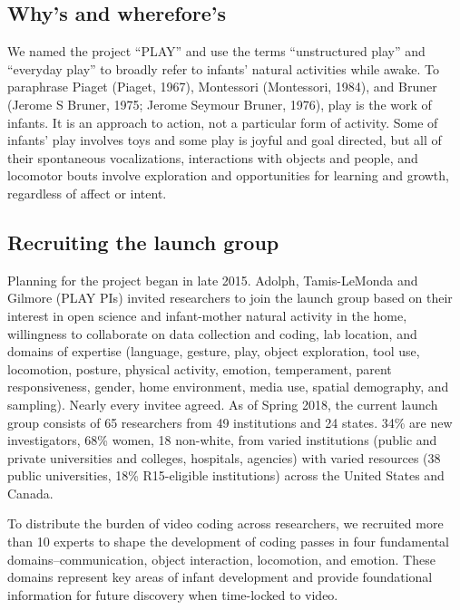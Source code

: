 \documentclass[english,man]{apa6}
\theoremstyle{definition}
\theoremstyle{definition}
\theoremstyle{definition}
\theoremstyle{remark}
\begin{document}
\subsection{Why's and wherefore's}\label{whys-and-wherefores}

We named the project \enquote{PLAY} and use the terms
\enquote{unstructured play} and \enquote{everyday play} to broadly refer
to infants' natural activities while awake. To paraphrase Piaget
(Piaget, 1967), Montessori (Montessori, 1984), and Bruner (Jerome S
Bruner, 1975; Jerome Seymour Bruner, 1976), play is the work of infants.
It is an approach to action, not a particular form of activity. Some of
infants' play involves toys and some play is joyful and goal directed,
but all of their spontaneous vocalizations, interactions with objects
and people, and locomotor bouts involve exploration and opportunities
for learning and growth, regardless of affect or intent.

\subsection{Recruiting the launch
group}\label{recruiting-the-launch-group}

Planning for the project began in late 2015. Adolph, Tamis-LeMonda and
Gilmore (PLAY PIs) invited researchers to join the launch group based on
their interest in open science and infant-mother natural activity in the
home, willingness to collaborate on data collection and coding, lab
location, and domains of expertise (language, gesture, play, object
exploration, tool use, locomotion, posture, physical activity, emotion,
temperament, parent responsiveness, gender, home environment, media use,
spatial demography, and sampling). Nearly every invitee agreed. As of
Spring 2018, the current launch group consists of 65 researchers from 49
institutions and 24 states. 34\% are new investigators, 68\% women, 18
non-white, from varied institutions (public and private universities and
colleges, hospitals, agencies) with varied resources (38 public
universities, 18\% R15-eligible institutions) across the United States
and Canada.

To distribute the burden of video coding across researchers, we
recruited more than 10 experts to shape the development of coding passes
in four fundamental domains--communication, object interaction,
locomotion, and emotion. These domains represent key areas of infant
development and provide foundational information for future discovery
when time-locked to video.
\end{document}
